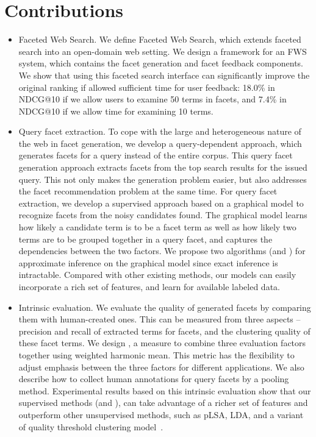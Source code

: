 \section{Contributions}
\label{sec:intro-contributions}
\begin{itemize}
 \item Faceted Web Search. We define Faceted Web Search, which extends faceted search into an open-domain web setting. We design a framework for an FWS system, which contains the facet generation and facet feedback components. We show that using this faceted search interface can significantly improve the original ranking if allowed sufficient time for user feedback: 18.0\% in NDCG@10 if we allow users to examine 50 terms in facets, and 7.4\% in NDCG@10 if we allow time for examining 10 terms. 

 \item Query facet extraction. To cope with the large and heterogeneous nature of the web in facet generation, we develop a query-dependent approach, which generates facets for a query instead of the entire corpus. This query facet generation approach extracts facets from the top search results for the issued query. This not only makes the generation problem easier, but also addresses the facet recommendation problem at the same time. For query facet extraction, we develop a supervised approach based on a graphical model to recognize facets from the noisy candidates found. The graphical model learns how likely a candidate term is to be a facet term as well as how likely two terms are to be grouped together in a query facet, and captures the dependencies between the two factors. We propose two algorithms (\QFI and \QFJ) for approximate inference on the graphical model since exact inference is intractable. Compared with other existing methods, our models can easily incorporate a rich set of features, and learn for available labeled data.

\item Intrinsic evaluation. We evaluate the quality of generated facets by comparing them with human-created ones. This can be measured from three aspects -- precision and recall of extracted terms for facets, and the clustering quality of these facet terms. We design \PRF, a measure to combine three evaluation factors together using weighted harmonic mean. This metric has the flexibility to adjust emphasis between the three factors for different applications. We also describe how to collect human annotations for query facets by a pooling method. Experimental results based on this intrinsic evaluation show that our supervised methods (\QFI and \QFJ), can take advantage of a richer set of features and outperform other unsupervised methods, such as pLSA, LDA, and a variant of quality threshold clustering model~\cite{dou2011finding}. 


\end{itemize}
